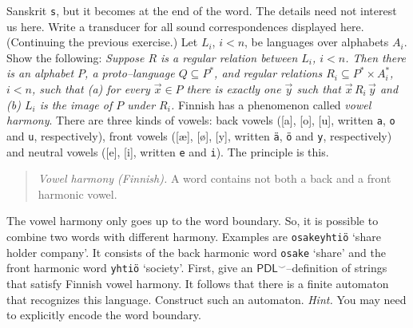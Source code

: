 Sanskrit {\tt s}, but it becomes {\tt {}} at the end 
of the word. The details need not interest us here. Write 
a transducer for all sound correspondences displayed here.
\vplatz
\exercise
(Continuing the previous exercise.)
Let $L_i$, $i < n$, be languages over alphabets $A_i$.
Show the following: {\it Suppose $R$ is a regular relation
between $L_i$, $i < n$. Then there is an alphabet $P$,
a proto--language $Q \subseteq P^{\ast}$, and regular
relations $R_i \subseteq P^{\ast} \times A_i^{\ast}$, $i < n$, 
such that (a) for every $\vec{x} \in P$ there is exactly one
$\vec{y}$ such that $\vec{x}\, R_i\, \vec{y}$ and (b) $L_i$
is the image of $P$ under $R_i$.}
\vplatz
\exercise
{}%
Finnish has a phenomenon called {\it vowel harmony}.
There are three kinds of vowels: back vowels ([a], [o], [u],
written {\tt a}, {\tt o} and {\tt u}, respectively), front vowels
([\ae], [\o], [y], written {\tt \"a}, {\tt \"o} and {\tt y},
respectively) and neutral vowels ([e], [i], written {\tt e}
and {\tt i}).  The principle is this.
\begin{quote}
{\sl Vowel harmony (Finnish).} A word contains not both a
back and a front harmonic vowel.
\end{quote}
The vowel harmony only goes up to the word boundary. So, it
is possible to combine two words with different harmony.
Examples are {\tt osakeyhti\"o} `share holder company'.
It consists of the back harmonic word {\tt osake} `share'
and the front harmonic word {\tt yhti\"o} `society'.
First, give an $\mathsf{PDL}^{\smallsmile}$--definition of
strings that satisfy Finnish vowel harmony. It follows that
there is a finite automaton that recognizes this language.
Construct such an automaton. {\it Hint.} You may need to
explicitly encode the word boundary.
